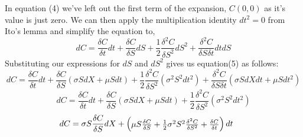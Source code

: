 \documentclass[11pt]{article}
\begin{document}
In equation (4) we've left out the first term of the expansion, $C(0,0)$ as it's value is just zero. We can then apply the multiplication identity $dt^2 = 0$ from Ito's lemma and simplify the equation to,
\begin{equation}
dC = \frac{\delta C}{\delta t}dt + \frac{\delta C}{\delta S}dS + \frac{1}{2}\frac{\delta^2 C}{\delta S^2}dS^2
+ \frac{\delta^2 C}{\delta S \delta t}dtdS
\end{equation}
Substituting our expressions for $dS$ and $dS^2$ gives us equation(5) as follows:
\begin{equation}
dC =\frac{\delta C}{\delta t}dt + \frac{\delta C}{\delta S}(\sigma S dX + \mu S dt) + \frac{1}{2}\frac{\delta^2 C}{\delta S^2}(\sigma ^2 S^2 dt^2)+ \frac{\delta^2 C}{\delta S \delta t}(\sigma S dXdt + \mu S dt^2)
\end{equation}
\begin{equation*}
dC = \frac{\delta C}{\delta t}dt + \frac{\delta C}{\delta S}(\sigma S dX + \mu S dt) + \frac{1}{2}\frac{\delta^2 C}{\delta S^2}(\sigma ^2 S^2 dt^2)
\end{equation*}
\begin{equation*}
dC = \sigma S \frac{\delta C}{\delta S}dX + 
\setlength{\arraycolsep}{2pt}\begin{pmatrix} \mu S \frac{\delta C}{\delta S} + \frac{1}{2}\sigma^2 S^2\frac{\delta^2 C}{\delta S^2} + \frac{\delta C}{\delta t}\end{pmatrix}dt\phantom{cccc}
\end{equation*}
\end{document}
